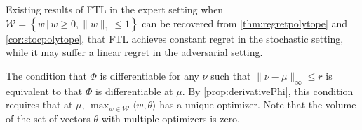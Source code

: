 \documentclass[english]{article}
\newcommand{\cW}{\mathcal{W}}
\newcommand{\ip}[1]{\langle#1\rangle}
\newcommand{\set}[2]{\left\{#1 \,\vert\, #2 \right\}}
\begin{document}
\begin{comm}
	Existing results of FTL in the expert setting  when $\cW = \set{w}{w\ge 0, \|w\|_1\le 1}$ can be recovered from \cref{thm:regretpolytope} and \cref{cor:stocpolytope}, that FTL achieves constant regret in the stochastic setting, while it may suffer a linear regret in the adversarial setting.
\end{comm}
\fi
	The condition that $\Phi$ is differentiable for any $\nu$ such that $\|\nu-\mu\|_\infty \le r$ is equivalent to that $\Phi$ is differentiable at $\mu$. 
	By \cref{prop:derivativePhi}, this condition requires that at $\mu$, $\max_{w\in\cW} \ip{w,\theta}$ has a unique optimizer.
	Note that the volume of the set of vectors $\theta$ with multiple optimizers is zero. 
\end{document}
